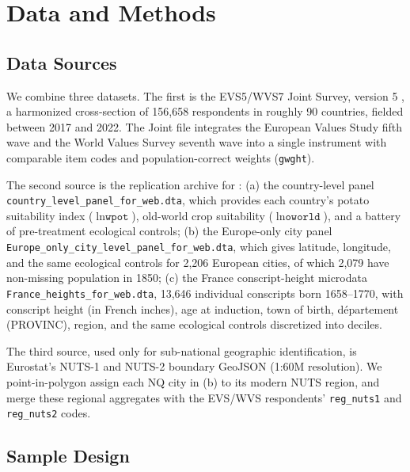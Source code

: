 
\section{Data and Methods}

\subsection{Data Sources}

We combine three datasets. The first is the EVS5/WVS7 Joint Survey, version 5 \citep{EVSWVSJointV5}, a harmonized cross-section of 156{,}658 respondents in roughly 90 countries, fielded between 2017 and 2022. The Joint file integrates the European Values Study fifth wave and the World Values Survey seventh wave into a single instrument with comparable item codes and population-correct weights (\texttt{gwght}).

The second source is the replication archive for \citet{NunnQian2011}: (a) the country-level panel \texttt{country\_level\_panel\_for\_web.dta}, which provides each country's potato suitability index ($\ln \texttt{wpot}$), old-world crop suitability ($\ln \texttt{oworld}$), and a battery of pre-treatment ecological controls; (b) the Europe-only city panel \texttt{Europe\_only\_city\_level\_panel\_for\_web.dta}, which gives latitude, longitude, and the same ecological controls for 2{,}206 European cities, of which 2{,}079 have non-missing population in 1850; (c) the France conscript-height microdata \texttt{France\_heights\_for\_web.dta}, 13{,}646 individual conscripts born 1658--1770, with conscript height (in French inches), age at induction, town of birth, département (PROVINC), region, and the same ecological controls discretized into deciles.

The third source, used only for sub-national geographic identification, is Eurostat's NUTS-1 and NUTS-2 boundary GeoJSON (1:60M resolution). We point-in-polygon assign each NQ city in (b) to its modern NUTS region, and merge these regional aggregates with the EVS/WVS respondents' \texttt{reg\_nuts1} and \texttt{reg\_nuts2} codes.

\subsection{Sample Design}

